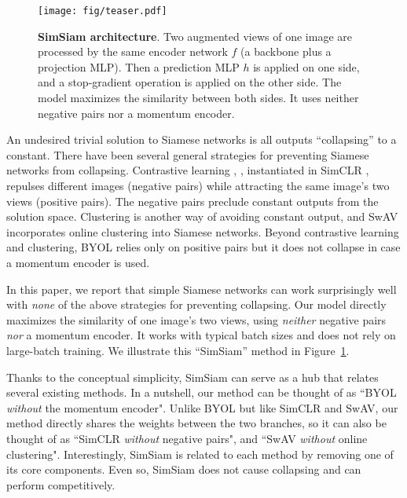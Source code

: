\documentclass[final]{cvpr}
\begin{document}
\begin{figure}[t]
\centering
\vspace{-1em}
\texttt{[image: fig/teaser.pdf]}
\vspace{-.5em}
\caption{
\textbf{SimSiam architecture}. Two augmented views of one image are processed by the same encoder network $f$ (a backbone plus a projection MLP). Then a prediction MLP $h$ is applied on one side, and a stop-gradient operation is applied on the other side. The model maximizes the similarity between both sides.
It uses neither negative pairs nor a momentum encoder.
\label{fig:teaser}
\vspace{-.5em}
}
\end{figure}


An undesired trivial solution to Siamese networks is all outputs ``collapsing'' to a constant. 
There have been several general strategies for preventing Siamese networks from collapsing.
Contrastive learning \cite{Hadsell2006}, \eg, instantiated in SimCLR \cite{Chen2020}, repulses different images (negative pairs) while attracting the same image's two views (positive pairs).
The negative pairs preclude constant outputs from the solution space. 
Clustering \cite{Caron2018} is another way of avoiding constant output, and SwAV \cite{Caron2020} incorporates online clustering into Siamese networks.
Beyond contrastive learning and clustering, BYOL \cite{Grill2020} relies only on positive pairs but it does not collapse in case a momentum encoder is used.

In this paper, we report that simple Siamese networks can work surprisingly well with \emph{none} of the above strategies for preventing collapsing. 
Our model directly maximizes the similarity of one image's two views, using \emph{neither} negative pairs \emph{nor} a momentum encoder. It works with typical batch sizes and does not rely on large-batch training.
We illustrate this ``SimSiam'' method in Figure~\ref{fig:teaser}.

Thanks to the conceptual simplicity, SimSiam can serve as a hub that relates several existing methods.
In a nutshell, our method can be thought of as ``BYOL \emph{without} the momentum encoder". Unlike BYOL but like SimCLR and SwAV, our method directly shares the weights between the two branches, so it can also be thought of as ``SimCLR \emph{\mbox{without}} negative pairs", and ``SwAV \emph{without} online clustering". Interestingly, SimSiam is related to each method by removing one of its core components. Even so, SimSiam does not cause collapsing and can perform competitively.
\end{document}

